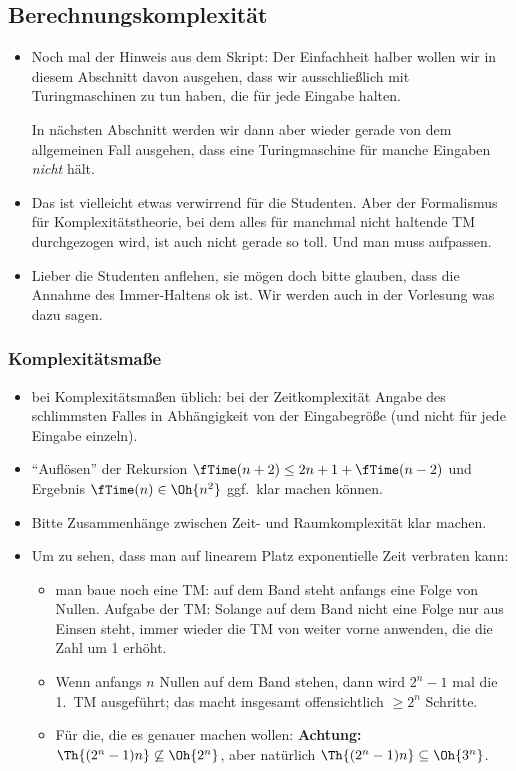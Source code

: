 \documentclass[12pt]{article}
\theoremstyle{margin}
\theoremstyle{margin}
\begin{document}
\subsection{Berechnungskomplexit\"at}

  \begin{itemize}
  \item Noch mal der Hinweis aus dem Skript: Der Einfachheit halber
    wollen wir in diesem Abschnitt davon ausgehen, dass wir
    ausschließlich mit Turingmaschinen zu tun haben, die für jede
    Eingabe halten.

    In nächsten Abschnitt werden wir dann aber wieder gerade von dem
    allgemeinen Fall ausgehen, dass eine Turingmaschine für manche
    Eingaben \emph{nicht} hält.
  \item Das ist vielleicht etwas verwirrend für die Studenten. Aber
    der Formalismus für Komplexitätstheorie, bei dem alles für
    manchmal nicht haltende TM durchgezogen wird, ist auch nicht
    gerade so toll. Und man muss aufpassen.
  \item Lieber die Studenten anflehen, sie mögen doch bitte glauben,
    dass die Annahme des Immer-Haltens ok ist. Wir werden auch in der
    Vorlesung was dazu sagen.
  \end{itemize}

\subsubsection{Komplexit\"atsma\ss e}

  \begin{itemize}
  \item bei Komplexitätsmaßen üblich: \zB bei der Zeitkomplexität
    Angabe des schlimmsten Falles in Abhängigkeit von der
    Eingabegröße (und nicht für jede Eingabe einzeln).
  \item "`Auflösen"' der Rekursion $\fTime(n+2) \leq 2n+1 +
    \fTime(n-2)$ und Ergebnis $\fTime(n) \in \Oh{n^2}$ ggf.\ klar
    machen können.
  \end{itemize}

  \begin{itemize}
  \item Bitte Zusammenhänge zwischen Zeit- und
    Raumkomplexität klar machen.
  \item Um zu sehen, dass man auf linearem Platz exponentielle Zeit
    verbraten kann:
    \begin{itemize}
    \item man baue noch eine TM: auf dem Band steht anfangs eine Folge
      von Nullen. Aufgabe der TM: Solange auf dem Band nicht eine
      Folge nur aus Einsen steht, immer wieder die TM von weiter vorne
      anwenden, die die Zahl um 1 erhöht.
    \item Wenn anfangs $n$ Nullen auf dem Band stehen, dann wird
      $2^n-1$ mal die 1.~TM ausgeführt; das macht insgesamt
      offensichtlich $\geq 2^n$ Schritte.
    \item Für die, die es genauer machen wollen: \textbf{Achtung:}
      $\Th{(2^n-1)n} \not\subseteq \Oh{2^n}$, aber natürlich \zB
      $\Th{(2^n-1)n} \subseteq \Oh{3^n}$.
    \end{itemize}
  \end{itemize}
\end{document}
